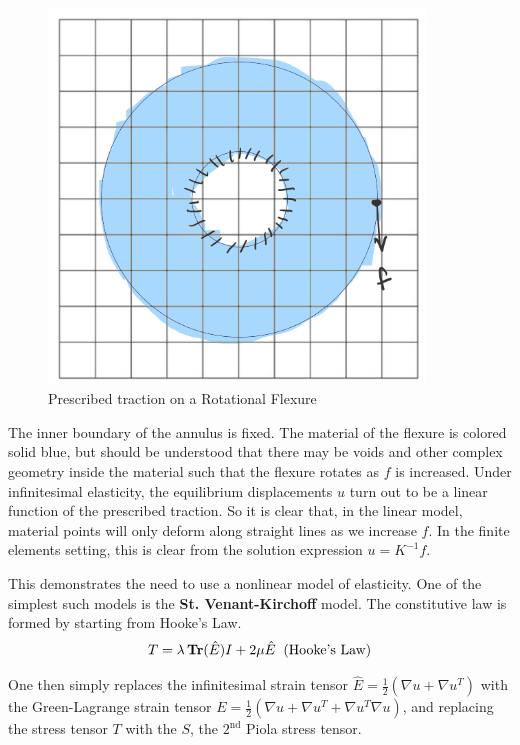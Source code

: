 \documentclass[11pt,letterpaper]{article}
\begin{document}
\begin{figure}[H]
\begin{center}
\includegraphics[width=10cm, keepaspectratio]{prescribed_traction_experiment}
\caption{Prescribed traction on a Rotational Flexure}
\label{prescribed-traction-experiment}
\end{center}
\end{figure}

The inner boundary of the annulus is fixed. The material of the flexure is colored solid blue, but should be understood that there may be voids and other complex geometry inside the material such that the flexure rotates as $f$ is increased. Under infinitesimal elasticity, the equilibrium displacements  $u$ turn out to be a linear function of the prescribed traction. So it is clear that, in the linear model, material points will only deform along straight lines as we increase $f$. In the finite elements setting, this is clear from the solution expression $u = K^{-1} f$.

This demonstrates the need to use a nonlinear model of elasticity. One of the simplest such models is the \textbf{St. Venant-Kirchoff} model. The constitutive law is formed by starting from Hooke's Law.
$$ T = \lambda \mathop{\bf Tr}(\hat E) I + 2 \mu \hat E \;\; \text{(Hooke's Law)}$$

One then simply replaces the infinitesimal strain tensor $\hat{E} = \frac 1 2 (\nabla u + \nabla u^T)$ with the Green-Lagrange strain tensor $E =\frac 1 2 (\nabla u + \nabla u^T + \nabla u^T \nabla u) $, and replacing the stress tensor $T$ with the $ S$, the $2^\text{nd}$ Piola stress tensor.
\end{document}
